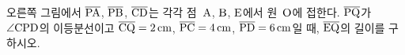\noindent\begin{minipage}[t]{0.58\linewidth}\vspace{0pt}\raggedright 오른쪽 그림에서 $\overline{\mathrm{PA}}$, $\overline{\mathrm{PB}}$, $\overline{\mathrm{CD}}$는 각각 점~$\mathrm{A}$, $\mathrm{B}$, $\mathrm{E}$에서 원~$\mathrm{O}$에 접한다. $\overline{\mathrm{PQ}}$가 $\angle\mathrm{CPD}$의 이등분선이고 $\overline{\mathrm{CQ}}=2\,\mathrm{cm}$, $\overline{\mathrm{PC}}=4\,\mathrm{cm}$, $\overline{\mathrm{PD}}=6\,\mathrm{cm}$일 때, $\overline{\mathrm{EQ}}$의 길이를 구하시오.\end{minipage}\hfill\begin{minipage}[t]{0.4\linewidth}\vspace{0pt}\centering \resizebox{\ifdim\width>\linewidth\linewidth\else\width\fi}{!}{}\end{minipage}\par
